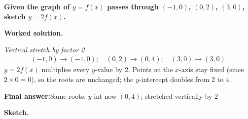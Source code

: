 \documentclass[11pt]{article}
\newcommand{\question}[1]{\par\medskip\noindent\textbf{#1}\par}
\begin{document}
\question{Given the graph of \( y = f(x) \) passes through \( (-1, 0) \), \( (0, 2) \), \( (3, 0) \), sketch \( y = 2f(x) \).}

\textbf{Worked solution.}

\textit{Vertical stretch by factor 2}
\[\begin{gathered}
(-1, 0) \to (-1, 0); \quad (0, 2) \to (0, 4); \quad (3, 0) \to (3, 0)
\end{gathered}\]
\( y = 2f(x) \) multiplies every \( y \)-value by 2. Points on the \( x \)-axis stay fixed (since \( 2 \times 0 = 0 \)), so the roots are unchanged; the \( y \)-intercept doubles from 2 to 4.

\begin{answerbox}
\textbf{Final answer:}\quad Same roots; \(\displaystyle y\)-int now \(\displaystyle (0,4)\); stretched vertically by 2
\end{answerbox}
\textbf{Sketch.}
\end{document}
